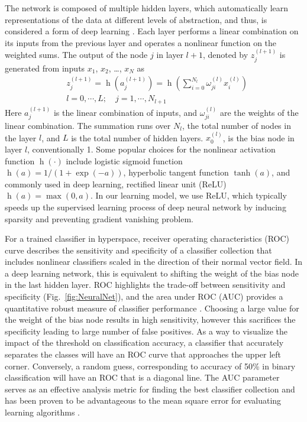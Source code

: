 \documentclass[aps,pra,reprint,longbibliography,superscriptaddress]{revtex4-1}
\DeclareMathOperator{\h}{h} %
\begin{document}
The network is composed of multiple hidden layers, which automatically learn representations of the data at different levels of abstraction, and thus, is considered a form of deep learning \cite{lecun2015deep, schmidhuber2015deep}. Each layer performs a linear combination on its inputs from the previous layer and operates a nonlinear function on the weighted sums. The output of the node $j$ in layer $l+1$, denoted by $z_j^{(l+1)}$ is generated from inputs $x_1$, $x_2$, \ldots, $x_N$ as
\begin{equation}
\begin{split}
& z_j^{(l+1)} = \h(a_j^{(l+1)}) = \h(\sum_{i=0}^{N_l} \omega_{ji}^{(l)} x_i^{(l)})\\
& l=0,\cdots,L;\quad j=1,\cdots,N_{l+1}
\end{split}
\end{equation}
Here $a_j^{(l+1)}$ is the linear combination of inputs, and $\omega_{ji}^{(l)}$ are the weights of the linear combination. The summation runs over $N_l$, the total number of nodes in the layer $l$, and $L$ is the total number of hidden layers. $x_0^{(l)}$, is the bias node in layer $l$, conventionally 1. Some popular choices for the nonlinear activation function $\h(\cdot)$ include logistic sigmoid function $\h(a)=1/(1+\exp(-a))$, hyperbolic tangent function $\tanh(a)$, and commonly used in deep learning, rectified linear unit (ReLU) $\h(a) = \max(0,a)$. In our learning model, we use ReLU, which typically speeds up the supervised learning process of deep neural network by inducing sparsity and preventing gradient vanishing problem. 

For a trained classifier in hyperspace, receiver operating characteristics (ROC) curve describes the sensitivity and specificity of a classifier collection that includes nonlinear classifiers scaled in the direction of their normal vector field. In a deep learning network, this is equivalent to shifting the weight of the bias node in the last hidden layer. ROC highlights the trade-off between sensitivity and specificity (Fig.~\ref{fig:NeuralNet}), and the area under ROC (AUC) provides a quantitative robust measure of classifier performance \cite{hanley1982meaning, ling2003auc, cortes2004auc, liu2008roc}. Choosing a large value for the weight of the bias node results in high sensitivity, however this sacrifices the specificity leading to large number of false positives. As a way to visualize the impact of the threshold on classification accuracy, a classifier that accurately separates the classes will have an ROC curve that approaches the upper left corner. Conversely, a random guess, corresponding to accuracy of 50\% in binary classification will have an ROC that is a diagonal line. The AUC parameter serves as an effective analysis metric for finding the best classifier collection and has been proven to be advantageous to the mean square error for evaluating learning algorithms \cite{verrelst1998use}. 
\end{document}
